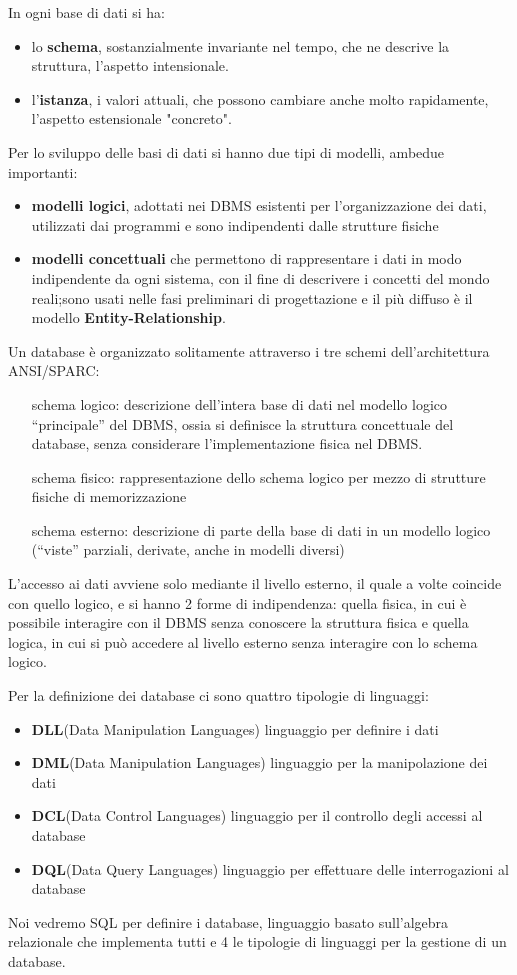 \documentclass[a4paper,12pt, oneside]{book}
\begin{document}
In ogni base di dati si ha:
\begin{itemize}
	\item lo \textbf{schema}, sostanzialmente invariante nel tempo, che ne descrive la struttura, l'aspetto intensionale.
	\item l'\textbf{istanza}, i valori attuali, che possono cambiare anche molto rapidamente, l'aspetto estensionale "concreto".
\end{itemize}
Per lo sviluppo delle basi di dati si hanno due tipi di modelli, ambedue importanti:
\begin{itemize}
	\item \textbf{modelli logici}, adottati nei DBMS esistenti per l'organizzazione dei dati,
	      utilizzati dai programmi e sono indipendenti dalle strutture fisiche
	\item \textbf{modelli concettuali} che permettono di rappresentare i dati in modo indipendente da ogni sistema,
	      con il fine di descrivere i concetti del mondo reali;sono usati nelle fasi preliminari di progettazione
	      e il più diffuso è il modello \textbf{Entity-Relationship}.
\end{itemize}
Un database è organizzato solitamente attraverso i tre schemi dell'architettura ANSI/SPARC:
\begin{enumerate}
	\item [schema logico:] descrizione dell'intera base di dati nel modello logico “principale” del DBMS,
	      ossia si definisce la struttura concettuale del database,
	      senza considerare l'implementazione fisica nel DBMS.
	\item [schema fisico:] rappresentazione dello schema logico per mezzo di strutture fisiche di memorizzazione
	\item [schema esterno:] descrizione di parte della base di dati in un modello logico
	      (“viste” parziali, derivate, anche in modelli diversi)
\end{enumerate}
L'accesso ai dati avviene solo mediante il livello esterno, il quale a volte coincide con quello logico,
e si hanno 2 forme di indipendenza: quella fisica, in cui è possibile interagire con il DBMS senza conoscere la struttura fisica
e quella logica, in cui si può accedere al livello esterno senza interagire con lo schema logico.

Per la definizione dei database ci sono quattro tipologie di linguaggi:
\begin{itemize}
	\item \textbf{DLL}(Data Manipulation Languages) linguaggio per definire i dati
	\item \textbf{DML}(Data Manipulation Languages) linguaggio per la manipolazione dei dati
	\item \textbf{DCL}(Data Control Languages) linguaggio per il controllo degli accessi al database
	\item \textbf{DQL}(Data Query Languages) linguaggio per effettuare delle interrogazioni al database
\end{itemize}
Noi vedremo SQL per definire i database, linguaggio basato sull'algebra relazionale che implementa tutti e 4 le tipologie
di linguaggi per la gestione di un database.
\end{document}
